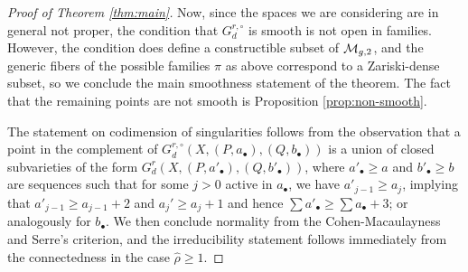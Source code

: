 \documentclass{amsart}
\begin{document}
\begin{proof}[Proof of Theorem \ref{thm:main}]
Now, since the spaces we are considering are in general not proper, the condition that $G^{r,\circ}_d$ is smooth is not open in families. However, the condition does define a constructible subset of ${\mathcal M}_{g,2}$, 
and the generic fibers of the possible families $\pi$ as above correspond to
a Zariski-dense subset, so we conclude the main smoothness statement of the 
theorem. The fact that the remaining points are not smooth is Proposition 
\ref{prop:non-smooth}. 

The statement on codimension of singularities follows 
from the observation that a point in the complement of 
$G^{r,\circ}_d(X,(P,a_{\bullet}),(Q,b_{\bullet}))$ 
is a union of closed subvarieties of the form $G^{r}_d(X,(P,a'_{\bullet}),(Q,b'_{\bullet}))$, where $a'_\bullet \ge a$ and $b'_\bullet \ge b$ are sequences such that for some $j>0$ active in $a_\bullet$, we have $a'_{j-1} \ge a_j$, implying that $a'_{j-1}\ge a_{j-1}+2$ and $a_j' \ge a_j+1$ and hence $\sum a'_\bullet \ge \sum a_\bullet+3$; or analogously for $b_\bullet$.
We then conclude normality from the Cohen-Macaulayness and
Serre's criterion, and the irreducibility statement follows immediately
from the connectedness in the case $\widehat{\rho} \geq 1$.
\end{proof}
\end{document}
